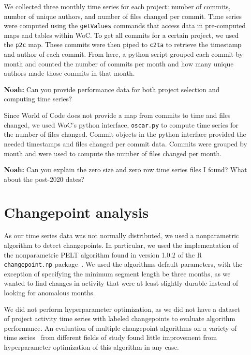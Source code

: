 \documentclass[10pt,conference]{IEEEtran}
\begin{document}
We collected three monthly time series for each project: number of commits, number of unique authors, and number of files changed per commit. Time series were computed using the \texttt{getValues} commands that access data in pre-computed maps and tables within WoC. To get all commits for a certain project, we used the \texttt{p2c} map. These commits were then piped to \texttt{c2ta} to retrieve the timestamp and author of each commit. From here, a python script grouped each commit by month and counted the number of commits per month and how many unique authors made those commits in that month.

\textbf{Noah:} Can you provide performance data for both project selection and computing time series?

Since World of Code does not provide a map from commits to time and files changed, we used WoC's python interface, \texttt{oscar.py} to compute time series for the number of files changed. Commit objects in the python interface provided the needed timestamps and files changed per commit data. Commits were grouped by month and were used to compute the number of files changed per month.

\textbf{Noah:} Can you explain the zero size and zero row time series files I found? What about the post-2020 dates?\\

\section{Changepoint analysis}

As our time series data was not normally distributed, we used a nonparametric algorithm to detect changepoints. In particular, we used the implementation of the nonparametric PELT algorithm found in version 1.0.2 of the R \texttt{changepoint.np} package~\cite{killick2014changepoint}. We used the algorithms default parameters, with the exception of specifying the minimum segment length be three months, as we wanted to find changes in activity that were at least slightly durable instead of looking for anomalous months. 

We did not perform hyperparameter optimization, as we did not have a dataset of project activity time series with labeled changepoints to evaluate algorithm performance. An evaluation of multiple changepoint algorithms on a variety of time series~\cite{van2020evaluation} from different fields of study found little improvement from hyperparameter optimization of this algorithm in any case.
\end{document}
